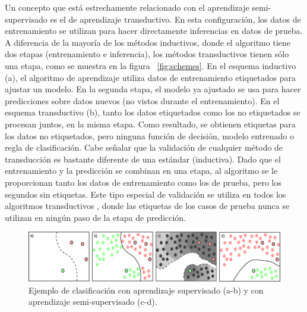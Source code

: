 
Un concepto que está estrechamente relacionado con el aprendizaje semi-supervisado es el de aprendizaje transductivo. En esta configuración, los datos de
entrenamiento se utilizan para hacer directamente inferencias en datos de prueba. A diferencia de la mayoría de los métodos inductivos, donde el algoritmo
tiene dos etapas (entrenamiento e inferencia), los métodos transductivos tienen sólo una etapa, como se muestra en la figura ~\ref{fig:schemes}. En el esquema
inductivo (a), el algoritmo de aprendizaje utiliza datos de entrenamiento etiquetados para ajustar un modelo. En la segunda etapa, el modelo ya ajustado se usa
para hacer predicciones sobre datos nuevos (no vistos durante el entrenamiento). En el esquema transductivo (b), tanto los datos etiquetados como los no
etiquetados se procesan juntos, en la misma etapa. Como resultado, se obtienen etiquetas para los datos no etiquetados, pero ninguna función de decisión, modelo
entrenado o regla de clasificación. Cabe señalar que la validación de cualquier método de transducción es bastante diferente de una estándar (inductiva). Dado
que el entrenamiento y la predicción se combinan en una etapa, al algoritmo se le proporcionan tanto los datos de entrenamiento como los de prueba, pero los
segundos sin etiquetas. Este tipo especial de validación se utiliza en todos los algoritmos transductivos \citep{chapelle2006semi}, donde las etiquetas de los
casos de prueba nunca se utilizan en ningún paso de la etapa de predicción.

\begin{figure}[tpb]
	\centering
	\includegraphics[width=\textwidth]{fig/semivssuperv.eps}
	\caption[Aprendizaje semi-supervisado vs supervisado]{Ejemplo de clasificación con aprendizaje supervisado (a-b) y con aprendizaje semi-supervisado (c-d).}
	\label{fig:semivssuperv}
\end{figure}


